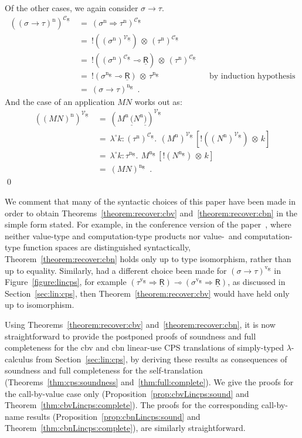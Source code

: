 \documentclass{LMCS}
\newcommand{\comptype}[1]{\underline{#1}}
\newcommand{\CR}{\comptype{\mathsf{R}}}
\newcommand{\lpop}{\multimap}
\newcommand{\Cfun}{\Rightarrow}
\newcommand{\Ccopower}[2]{! #1 \, {\otimes} \, #2}
\newcommand{\In}[2]{#1 \colon  \! #2}
\newcommand{\compop}[1]{\underline{#1}}
\newcommand{\Cappl}[2]{#1\compop{(}#2\compop{)}}
\newcommand{\bang}[1]{{! #1}}
\newcommand{\llambda}{\lambda^{\!\circ\!}}
\newcommand{\llam}[3]{\llambda \In{#1}{#2}.\: #3}
\newcommand{\lappl}[2]{#1[#2]}
\newcommand{\copowerterm}[2]{{\bang{#1}}\! \otimes \! #2}
\newcommand{\Lfun}{\to}
\newcommand{\Lappl}[2]{#1  #2}
\newcommand{\cbn}[1]{#1^{\mathrm{n}}}
\newcommand{\cbvLincps}[1]{#1^{\mathrm{v_{\CR}}}}
\newcommand{\cbnLincps}[1]{#1^{\mathrm{n_{\CR}}}}
\newcommand{\CpsVT}[1]{#1^{\mathcal{V}_{\CR}}}
\newcommand{\CpsCT}[1]{#1^{\mathcal{C}_{\CR}}}
\newcommand{\CpsCTcbn}[1]{\CpsCT{(\cbn{#1})}}
\newcommand{\CpsVTcbn}[1]{\CpsVT{(\cbn{#1})}}
\begin{document}
Of the other cases, we again consider $\sigma \Lfun \tau$.
\begin{align*}
\CpsCTcbn{(\sigma \Lfun \tau)} \: & = \: \CpsCT{(\cbn{\sigma} \Cfun \cbn{\tau})}
\\
& = \: \Ccopower{(\CpsVTcbn{\sigma})}{\CpsCTcbn{\tau}}
\\
& = \: \Ccopower{(\CpsCTcbn{\sigma} \lpop \CR)}{\CpsCTcbn{\tau}}
\\ & = \: \Ccopower{(\cbnLincps{\sigma} \lpop \CR)}{\cbnLincps{\tau}}
& & \text{by induction hypothesis}
\\
& = \: \cbnLincps{(\sigma \Lfun \tau)} \enspace .
\end{align*}
And the case of an application $\Lappl{M}{N}$ works out as:
\begin{align*}
\CpsVTcbn{(\Lappl{M}{N})} \: 
& = \:  \CpsVT{(\Cappl{\cbn{M}\,}{\cbn{N}})}
\\
& = \: \llam{k}{\CpsCTcbn{\tau}}
   {\,\lappl{\CpsVTcbn{M}\,}{\copowerterm{(\CpsVTcbn{N})\,}{\,k}}}
\\
& = \: \llam{k}{\cbnLincps{\tau}}
   {\,\lappl{\cbnLincps{M}\,}{\copowerterm{(\cbnLincps{N})\,}{\,k}}}
\\
& = \: \cbnLincps{(\Lappl{M}{N})} \enspace .
\end{align*}
\qed

We comment that many of the syntactic choices of this paper have been  made 
in order to obtain Theorems~\ref{theorem:recover:cbv} and~\ref{theorem:recover:cbn}
in the simple form stated. For example, in the conference version of the paper~\cite{EMS:fossacs},
where neither value-type and computation-type products nor
value-\ and computation-type function spaces are distinguished syntactically,
Theorem~\ref{theorem:recover:cbn} holds only up to type isomorphism,
rather than up to equality. Similarly, had a different choice been made for
$\cbvLincps{(\sigma \Lfun \tau)}$
in Figure~\ref{figure:lincps}, for example
$(\cbvLincps{\tau} \Cfun \CR) \lpop  (\cbvLincps{\sigma} \Cfun  \CR)$,
as discussed in Section~\ref{sec:lin:cps}, then Theorem~\ref{theorem:recover:cbv}
would have held only up to isomorphism. 

Using Theorems~\ref{theorem:recover:cbv} and~\ref{theorem:recover:cbn}, it is now straightforward
to provide the postponed proofs of soundness
and full completeness for the cbv and cbn linear-use CPS translations of simply-typed $\lambda$-calculus from
Section~\ref{sec:lin:cps}, by deriving  these
results as consequences of soundness and full completeness for the self-translation
(Theorems~\ref{thm:cps:soundness} and~\ref{thm:full:complete}).
We give the proofs for the call-by-value case only 
(Proposition~\ref{prop:cbvLincps:sound} and Theorem~\ref{thm:cbvLincps:complete}).
The proofs for the corresponding call-by-name results 
(Proposition~\ref{prop:cbnLincps:sound} and Theorem~\ref{thm:cbnLincps:complete}),
are similarly straightforward.
\end{document}
